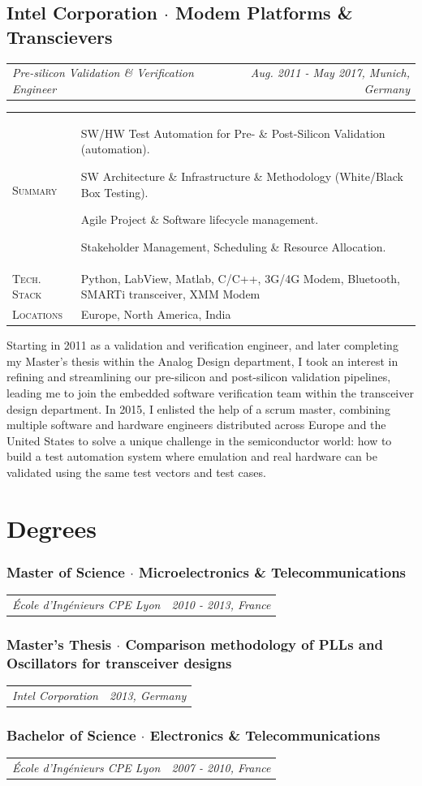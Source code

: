 \documentclass[10pt,a4paper]{moderncv}
\newcommand*{\makecareersubsection}[5]{
  \vspace{0.75em}
  \subsection{#1 {\color{color2}$\cdot$ #2}}
  \addvspace{-0.2em}
  {
    \color{color2}
    \begin{tabularx}{\textwidth}{LR}
      {\itshape #3} & {\itshape #4, #5}
    \end{tabularx}\par
  }
  \addvspace{1.25em}
  }
\newcommand*{\makeeducationparagraph}[5]{
  \subsubsection{#1 {\color{color2}$\cdot$ #2}}
  \addvspace{-0.5em}
  {
    \begin{tabularx}{\textwidth}{LR}
      {\itshape #3} & {\itshape #4, #5}
    \end{tabularx}\par
    }
  }
\begin{document}
\makecareersubsection{Intel Corporation}{Modem Platforms \& Transcievers}
  {Pre-silicon Validation \& Verification Engineer}
  {Aug. 2011 - May 2017}
  {Munich, Germany}


  \begin{tabularx}{\textwidth}{>{\scshape}l@{\hskip 3.5mm}L}
    Summary & SW/HW Test Automation for Pre- \& Post-Silicon Validation (automation).
    \par SW Architecture \& Infrastructure \& Methodology (White/Black Box Testing).
    \par Agile Project \& Software lifecycle management. 
    \par Stakeholder Management, Scheduling \& Resource Allocation.\\
    Tech. Stack & Python, LabView, Matlab, C/C++, 3G/4G Modem, Bluetooth, SMARTi transceiver, XMM Modem\\
    Locations & Europe, North America, India\\
  \end{tabularx}

  \vspace{1.5em}

  Starting in 2011 as a validation and verification engineer, and later completing my Master's thesis within the Analog Design department, I took an interest in refining and streamlining our pre-silicon and post-silicon validation pipelines, leading me to join the embedded software verification team within the transceiver design department. In 2015, I enlisted the help of a scrum master, combining multiple software and hardware engineers distributed across Europe and the United States to solve a unique challenge in the semiconductor world: how to build a test automation system where emulation and real hardware can be validated using the same test vectors and test cases.

 \clearpage
    
\section{Degrees}

  \makeeducationparagraph{Master of Science}{Microelectronics \& Telecommunications}
    {École d'Ingénieurs CPE Lyon}
    {2010 - 2013}{France}

  \makeeducationparagraph{Master's Thesis}{Comparison methodology of PLLs and Oscillators for transceiver designs}
    {Intel Corporation}
    {2013}{Germany}

  \makeeducationparagraph{Bachelor of Science}{Electronics \& Telecommunications}
    {École d'Ingénieurs CPE Lyon}
    {2007 - 2010}{France}
\end{document}
